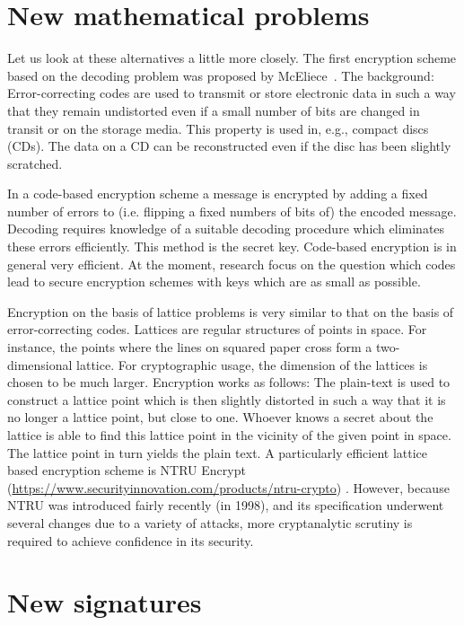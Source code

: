 \begin{bibunit}[babalpha]
\section{New mathematical problems}
\label{sec:problems}

Let us look at these alternatives a little more
closely.  The first encryption scheme based on the
decoding problem was proposed by
McEliece~\cite{mceliece:1978}.  The background:
Error-correcting codes are used to transmit or
store electronic data in such a way that they
remain undistorted even if a small number of bits
are changed in transit or on the storage media.
This property is used in, e.g., compact discs
(CDs).  The data on a CD can be reconstructed even
if the disc has been slightly scratched.

In a code-based encryption scheme a message is
encrypted by adding a fixed number of errors to
(i.e. flipping a fixed numbers of bits of) the
encoded message.  Decoding requires knowledge of a
suitable decoding procedure which eliminates these
errors efficiently.  This method is the secret
key.  Code-based encryption is in general very
efficient.  At the moment, research focus on the
question which codes lead to secure encryption
schemes with keys which are as small as possible.

Encryption on the basis of lattice problems
is very similar to that on the basis of
error-correcting codes.  Lattices are regular
structures of points in space.  For instance, the
points where the lines on squared paper cross form
a two-dimensional lattice.  For cryptographic
usage, the dimension of the lattices is chosen to
be much larger.  Encryption works as follows: The
plain-text is used to construct a lattice point
which is then slightly distorted in such a way
that it is no longer a lattice point, but close to
one.  Whoever knows a secret about the lattice is
able to find this lattice point in the vicinity of
the given point in space.  The lattice point in
turn yields the plain text.  A particularly
efficient lattice based encryption scheme is NTRU
Encrypt (\url{https://www.securityinnovation.com/products/ntru-crypto})
.
However, because
NTRU was introduced fairly recently (in 1998), and
its specification underwent several changes due to
a variety of attacks, more cryptanalytic scrutiny
is required to achieve confidence in its security.

\section{New signatures}
\label{sec:signatures}


\end{bibunit}
